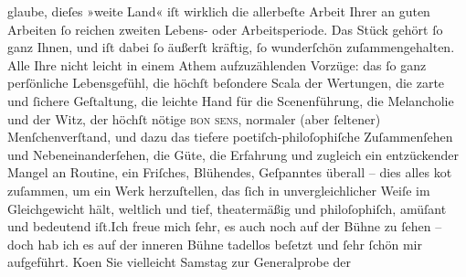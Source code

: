 \begin{ledgroupsized}[t]{13cm}
               glaube, dieſes »weite Land« iſt wirklich die
               allerbeſte Arbeit Ihrer an guten Arbeiten ſo reichen zweiten Lebens- oder
               Arbeitsperiode.\pend
           \pstart
           Das Stück gehört ſo ganz Ihnen, und iſt dabei ſo äußerſt kräftig, ſo wunderſchön
               zuſammengehalten. Alle Ihre nicht leicht in einem Athem aufzuzählenden Vorzüge: das
               ſo ganz perſönliche Lebensgefühl, die höchſt beſondere Scala der Wertungen, {\pb}die zarte und ſichere Geſtaltung,
               die leichte Hand für die Scenenführung, die Melancholie und der Witz, der höchſt
               nötige \textsc{bon sens}, normaler (aber ſeltener) Menſchenverſtand,
               und dazu das tiefere poetiſch-philoſophiſche Zuſammenſehen und Nebeneinanderſehen,
               die Güte, die Erfahrung und zugleich ein entzückender Mangel an Routine, ein
               Friſches, Blühendes, Geſpanntes überall – dies alles ko{\geminationm}t zuſammen, um ein {\pb}Werk
               herzuſtellen, das ſich in unvergleichlicher Weiſe im Gleichgewicht hält, weltlich und
               tief, theatermäßig und philoſophiſch, amüſant und bedeutend iſt.\hspace*{1.5em}Ich freue mich ſehr, es auch noch auf der Bühne zu ſehen – doch hab
               ich es auf der inneren Bühne tadellos beſetzt und ſehr ſchön mir aufgeführt.\pend
           \pstart
           Ko{\geminationm}en Sie vielleicht Samstag zur
               Generalprobe der \label{K_L01968-2v}
\end{ledgroupsized}

